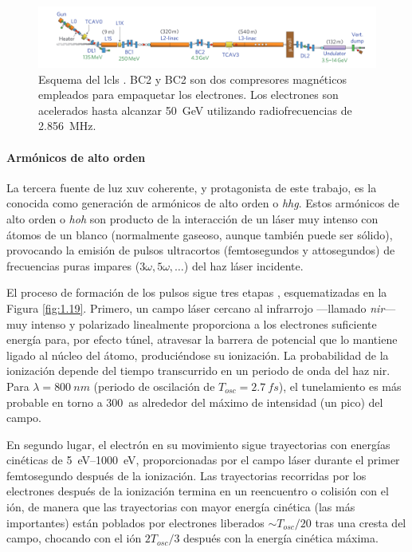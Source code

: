 \begin{figure}[htbp]
  \centering
  \includegraphics[width=\textwidth]{Figuras/ch1_lcls.png}
  \caption{Esquema del \acrshort{lcls} \autocite{Emma2010}. BC2 y BC2 son dos compresores magnéticos empleados para empaquetar los electrones. Los electrones son acelerados hasta alcanzar \qty{50}{GeV} utilizando radiofrecuencias de \qty{2,856}{MHz}.}
  \label{fig:1.18}
\end{figure}

\paragraph{Armónicos de alto orden}
La tercera fuente de luz \acrshort{xuv} coherente, y protagonista de este trabajo, es la conocida como generación de armónicos de alto orden o \emph{\acrfull{hhg}}. Estos armónicos de alto orden o \emph{\acrfull{hoh}} son producto de la interacción de un láser muy intenso con átomos de un blanco (normalmente gaseoso, aunque también puede ser sólido), provocando la emisión de pulsos ultracortos (femtosegundos y attosegundos) de frecuencias puras impares ($3 \omega, 5 \omega, \ldots$) del haz láser incidente. 

El proceso de formación de los pulsos sigue tres etapas \autocite{Corkum2007}, esquematizadas en la Figura \ref{fig:1.19}. Primero, un campo láser cercano al infrarrojo ---llamado \emph{\acrfull{nir}}--- muy intenso y polarizado linealmente proporciona a los electrones suficiente energía para, por efecto túnel, atravesar la barrera de potencial que lo mantiene ligado al núcleo del átomo, produciéndose su ionización. La probabilidad de la ionización depende del tiempo transcurrido en un periodo de onda del haz \acrshort{nir}. Para $\lambda = \qty{800}{nm}$ (periodo de oscilación de $T_{osc}=\qty{2.7}{fs}$), el tunelamiento es más probable en torno a \qty{300}{as} alrededor del máximo de intensidad (un pico) del campo.

En segundo lugar, el electrón en su movimiento sigue trayectorias con energías cinéticas de \qtyrange{5}{1000}{eV}, proporcionadas por el campo láser durante el primer femtosegundo después de la ionización. Las trayectorias recorridas por los electrones después de la ionización termina en un reencuentro o colisión con el ión, de manera que las trayectorias con mayor energía cinética (las más importantes) están poblados por electrones liberados $\sim T_{osc}/20$ tras una cresta del campo, chocando con el ión $2T_{osc}/3$ después con la energía cinética máxima. 

